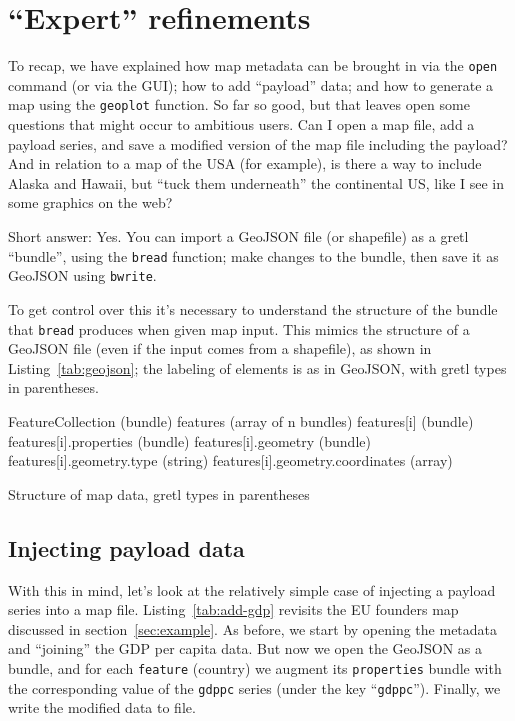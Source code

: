 \documentclass{article}
\begin{document}
\section{``Expert'' refinements}
\label{sec:expert}

To recap, we have explained how map metadata can be brought in via the
\texttt{open} command (or via the GUI); how to add ``payload'' data;
and how to generate a map using the \texttt{geoplot} function. So far
so good, but that leaves open some questions that might occur to
ambitious users.  Can I open a map file, add a payload series, and
save a modified version of the map file including the payload? And in
relation to a map of the USA (for example), is there a way to include
Alaska and Hawaii, but ``tuck them underneath'' the continental US,
like I see in some graphics on the web?

Short answer: Yes. You can import a GeoJSON file (or shapefile) as a
gretl ``bundle'', using the \texttt{bread} function; make changes to
the bundle, then save it as GeoJSON using \texttt{bwrite}.

To get control over this it's necessary to understand the structure of
the bundle that \texttt{bread} produces when given map input. This
mimics the structure of a GeoJSON file (even if the input comes from a
shapefile), as shown in Listing~\ref{tab:geojson}; the labeling of
elements is as in GeoJSON, with gretl types in parentheses.

\begin{script}[htbp]
\begin{scode}
FeatureCollection (bundle)
  features (array of n bundles)
    features[i] (bundle)
      features[i].properties (bundle)
      features[i].geometry   (bundle)
        features[i].geometry.type (string)
        features[i].geometry.coordinates (array)
\end{scode}
  \caption{Structure of map data, gretl types in parentheses}
  \label{tab:geojson}
\end{script}

\subsection{Injecting payload data}
\label{sec:inject}

With this in mind, let's look at the relatively simple case of
injecting a payload series into a map file. Listing~\ref{tab:add-gdp}
revisits the EU founders map discussed in section~\ref{sec:example}.
As before, we start by opening the metadata and ``joining'' the GDP
per capita data. But now we open the GeoJSON as a bundle, and for each
\texttt{feature} (country) we augment its \texttt{properties} bundle
with the corresponding value of the \texttt{gdppc} series (under the
key ``\texttt{gdppc}''). Finally, we write the modified data to file.
\end{document}
